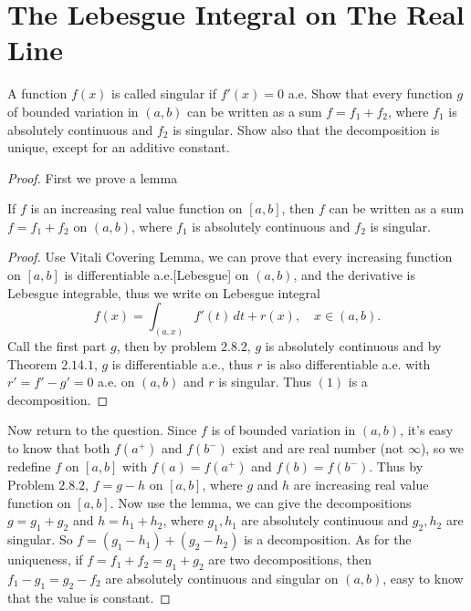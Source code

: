 \section{The Lebesgue Integral on The Real Line}
\begin{pro}%
	A function $f(x)$ is called singular if $f'(x)=0$ a.e. Show that every function $g$ of bounded variation in $(a,b)$ can be written as a sum $f=f_1+f_2$, where $f_1$ is absolutely continuous and $f_2$ is singular. Show also that the decomposition is unique, except for an additive constant.
\end{pro}
\begin{proof}
	First we prove a lemma
	\begin{lem}
	If $f$ is an increasing real value function on $[a,b]$, then $f$ can be written as a sum $f=f_1+f_2$ on $(a,b)$, where $f_1$ is absolutely continuous and $f_2$ is singular.
	\end{lem}
	\begin{proof}
		Use Vitali Covering Lemma, we can prove that every increasing function on $[a,b]$ is differentiable a.e.[Lebesgue] on $(a,b)$, and the derivative is Lebesgue integrable, thus we write on Lebesgue integral
		\[f(x)=\int_{(a,x)} f'(t)\,dt+r(x),\quad x\in(a,b).\tag{1}\]
		Call the first part $g$, then by problem $2.8.2$, $g$ is absolutely continuous and by Theorem $2.14.1$, $g$ is differentiable a.e., thus $r$ is also differentiable a.e. with $r'=f'-g'=0$ a.e. on $(a,b)$ and $r$ is singular.
		Thus $(1)$ is a decomposition.
	\end{proof}
	Now return to the question. Since $f$ is of bounded variation in $(a,b)$, it's easy to know that both $f(a^+)$ and $f(b^-)$ exist and are real number (not $\infty$), so we redefine $f$ on $[a,b]$ with $f(a)=f(a^+)$ and $f(b)=f(b^-)$. Thus by Problem $2.8.2$, $f=g-h$ on $[a,b]$, where $g$ and $h$ are increasing real value function on $[a,b]$. Now use the lemma, we can give the decompositions $g=g_1+g_2$ and $h=h_1+h_2$, where $g_1,h_1$ are absolutely continuous and $g_2,h_2$ are singular. So $f=(g_1-h_1)+(g_2-h_2)$ is a decomposition. As for the uniqueness, if $f=f_1+f_2=g_1+g_2$ are two decompositions, then $f_1-g_1=g_2-f_2$ are absolutely continuous and singular on $(a,b)$, easy to know that the value is constant.
\end{proof}

